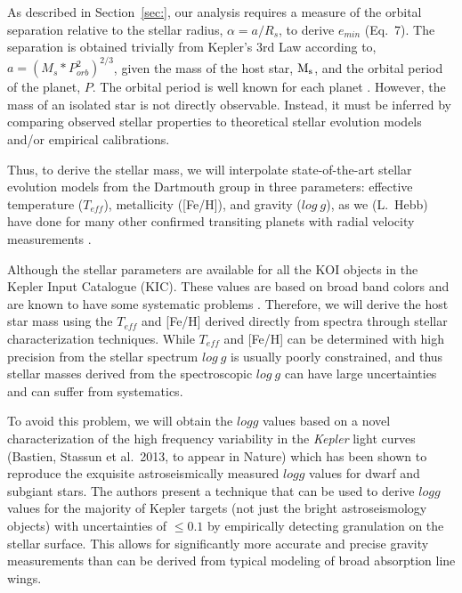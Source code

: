 As described in Section~\ref{sec:}, our analysis requires a measure of
the orbital separation relative to the stellar radius, $\alpha = a /
R_{s}$, to derive $e_{min}$ (Eq.\ 7).  The separation is obtained
trivially from Kepler's 3rd Law according to, $a =
(M_{s}*P_{orb}^{2})^{2/3}$, given the mass of the host star,
$\rm{M_{s}}$, and the orbital period of the planet, $P$.  The orbital
period is well known for each planet \citep{Batalha2012}.  However,
the mass of an isolated star is not directly observable.  Instead, it
must be inferred by comparing observed stellar properties to
theoretical stellar evolution models and/or empirical calibrations.

Thus, to derive the stellar mass, we will interpolate state-of-the-art
stellar evolution models from the Dartmouth group \citep{Dotter2008}
in three parameters: effective temperature ($T_{eff}$), metallicity
([Fe/H]), and gravity ($log~g$), as we (L.~Hebb) have done for many
other confirmed transiting planets with radial velocity
measurements \citep[i.e.][]{Hebb2009,Hebb2010,Bouchy2010,Yilen2013}.

Although the stellar parameters are available for all the KOI objects
in the Kepler Input Catalogue (KIC).  These values are based on broad
band colors and are known to have some systematic
problems \citep{Muirhead2012,Pinsonneault2012}.  Therefore, we will
derive the host star mass using the $T_{eff}$ and [Fe/H] derived
directly from spectra through stellar characterization techniques.
While $T_{eff}$ and [Fe/H] can be determined with high precision from
the stellar spectrum $log~g$ is usually poorly constrained, and thus
stellar masses derived from the spectroscopic $log~g$ can have large
uncertainties and can suffer from systematics.

To avoid this problem, we will obtain the $log g$ values based on a
novel characterization of the high frequency variability in the {\it
Kepler} light curves (Bastien, Stassun et al.\ 2013, to appear in
Nature) which has been shown to reproduce the exquisite
astroseismically measured $log g$ values \citep{Huber2013} for dwarf
and subgiant stars.  The authors present a technique that can be used
to derive $log g$ values for the majority of Kepler targets (not just
the bright astroseismology objects) with uncertainties of $\le 0.1$ by
empirically detecting granulation on the stellar surface.  This allows
for significantly more accurate and precise gravity measurements than
can be derived from typical modeling of broad absorption line wings.

